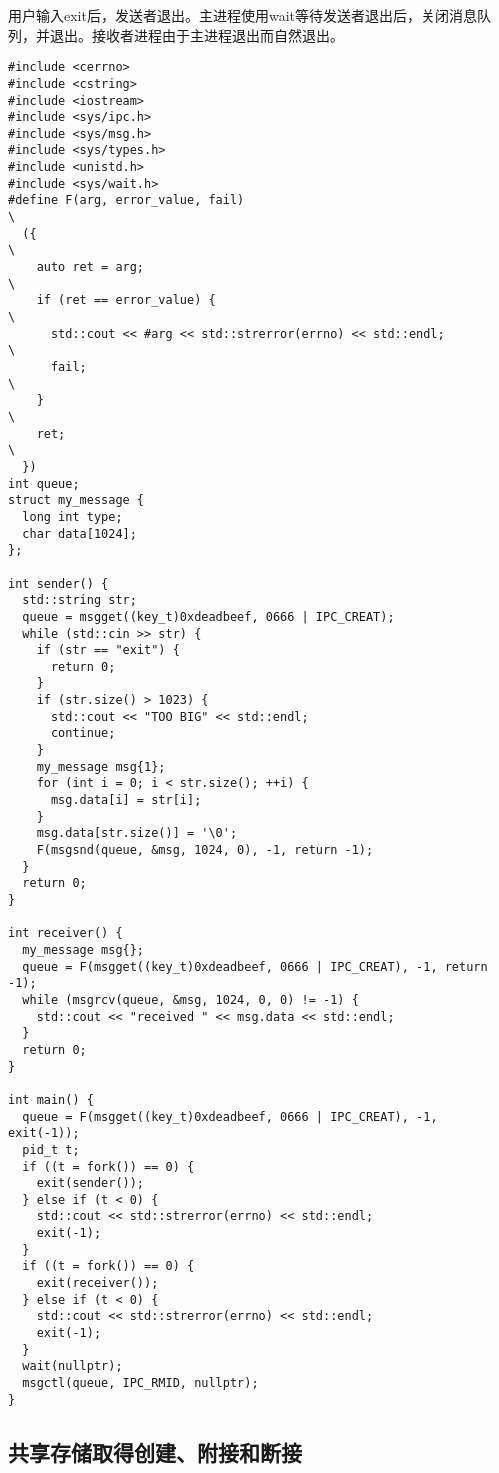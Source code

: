 \documentclass{ctexrep}
\begin{document}
用户输入exit后，发送者退出。主进程使用wait等待发送者退出后，关闭消息队列，并退出。接收者进程由于主进程退出而自然退出。

\begin{verbatim}
#include <cerrno>
#include <cstring>
#include <iostream>
#include <sys/ipc.h>
#include <sys/msg.h>
#include <sys/types.h>
#include <unistd.h>
#include <sys/wait.h>
#define F(arg, error_value, fail)                                              \
  ({                                                                           \
    auto ret = arg;                                                            \
    if (ret == error_value) {                                                  \
      std::cout << #arg << std::strerror(errno) << std::endl;                  \
      fail;                                                                    \
    }                                                                          \
    ret;                                                                       \
  })
int queue;
struct my_message {
  long int type;
  char data[1024];
};

int sender() {
  std::string str;
  queue = msgget((key_t)0xdeadbeef, 0666 | IPC_CREAT);
  while (std::cin >> str) {
    if (str == "exit") {
      return 0;
    }
    if (str.size() > 1023) {
      std::cout << "TOO BIG" << std::endl;
      continue;
    }
    my_message msg{1};
    for (int i = 0; i < str.size(); ++i) {
      msg.data[i] = str[i];
    }
    msg.data[str.size()] = '\0';
    F(msgsnd(queue, &msg, 1024, 0), -1, return -1);
  }
  return 0;
}

int receiver() {
  my_message msg{};
  queue = F(msgget((key_t)0xdeadbeef, 0666 | IPC_CREAT), -1, return -1);
  while (msgrcv(queue, &msg, 1024, 0, 0) != -1) {
    std::cout << "received " << msg.data << std::endl;
  }
  return 0;
}

int main() {
  queue = F(msgget((key_t)0xdeadbeef, 0666 | IPC_CREAT), -1, exit(-1));
  pid_t t;
  if ((t = fork()) == 0) {
    exit(sender());
  } else if (t < 0) {
    std::cout << std::strerror(errno) << std::endl;
    exit(-1);
  }
  if ((t = fork()) == 0) {
    exit(receiver());
  } else if (t < 0) {
    std::cout << std::strerror(errno) << std::endl;
    exit(-1);
  }
  wait(nullptr);
  msgctl(queue, IPC_RMID, nullptr);
}
\end{verbatim}

\subsection{共享存储取得创建、附接和断接}
\end{document}
